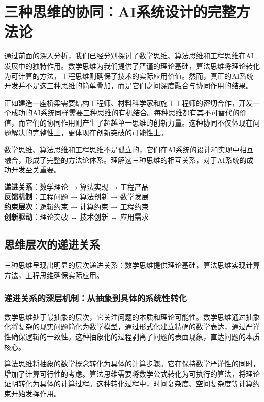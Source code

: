\section{三种思维的协同：AI系统设计的完整方法论}

通过前面的深入分析，我们已经分别探讨了数学思维、算法思维和工程思维在AI发展中的独特作用。数学思维为我们提供了严谨的理论基础，算法思维将理论转化为可计算的方法，工程思维则确保了技术的实际应用价值。然而，真正的AI系统开发并不是这三种思维的简单叠加，而是它们之间深度融合与协同作用的结果。

正如建造一座桥梁需要结构工程师、材料科学家和施工工程师的密切合作，开发一个成功的AI系统同样需要三种思维的有机结合。每种思维都有其不可替代的价值，而它们的协同作用则产生了超越单一思维的创新力量。这种协同不仅体现在问题解决的完整性上，更体现在创新突破的可能性上。

数学思维、算法思维和工程思维不是孤立的，它们在AI系统的设计和实现中相互融合，形成了完整的方法论体系。理解这三种思维的相互关系，对于AI系统的成功开发至关重要。

\begin{tcolorbox}[colback=red!5!white,colframe=red!75!black,title=协同关系：三种思维的融合模式]
\textbf{递进关系}：数学理论 → 算法实现 → 工程产品\\
\textbf{反馈机制}：工程问题 → 算法创新 → 数学发展\\
\textbf{约束层次}：逻辑约束 → 计算约束 → 工程约束\\
\textbf{创新驱动}：理论突破 ↔ 技术创新 ↔ 应用需求
\end{tcolorbox}

\subsection{思维层次的递进关系}

三种思维呈现出明显的层次递进关系：数学思维提供理论基础，算法思维实现计算方法，工程思维确保实际应用。

\subsubsection{递进关系的深层机制：从抽象到具体的系统性转化}

数学思维处于最抽象的层次，它关注问题的本质和理论可能性。数学思维通过抽象化将复杂的现实问题简化为数学模型，通过形式化建立精确的数学表达，通过严谨性确保逻辑的一致性。这种抽象化的过程剥离了问题的表面现象，直达问题的本质核心。

算法思维将抽象的数学概念转化为具体的计算步骤。它在保持数学严谨性的同时，增加了计算可行性的考虑。算法思维需要将数学公式转化为可执行的算法，将理论证明转化为具体的计算过程。这种转化过程中，时间复杂度、空间复杂度等计算约束开始发挥作用。

